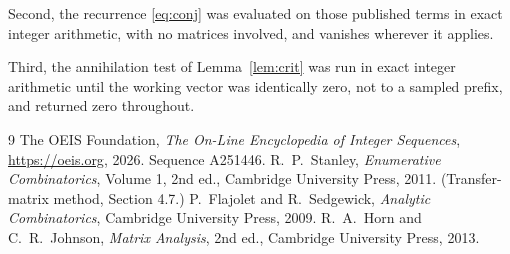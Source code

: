 \documentclass[11pt,a4paper]{article}
\theoremstyle{plain}
\theoremstyle{definition}
\begin{document}
Second, the recurrence \eqref{eq:conj} was evaluated on those published terms in exact
integer arithmetic, with no matrices involved, and vanishes wherever it applies.

Third, the annihilation test of Lemma~\ref{lem:crit} was run in exact integer arithmetic
until the working vector was identically zero, not to a sampled prefix, and returned zero
throughout.

\begin{thebibliography}{9}
 The OEIS Foundation, \emph{The On-Line Encyclopedia of Integer
Sequences}, \url{https://oeis.org}, 2026. Sequence A251446.
 R.~P.~Stanley, \emph{Enumerative Combinatorics}, Volume 1, 2nd ed.,
Cambridge University Press, 2011. (Transfer-matrix method, Section 4.7.)
 P.~Flajolet and R.~Sedgewick, \emph{Analytic Combinatorics}, Cambridge
University Press, 2009.
 R.~A.~Horn and C.~R.~Johnson, \emph{Matrix Analysis}, 2nd ed., Cambridge
University Press, 2013.
\end{thebibliography}
\end{document}
